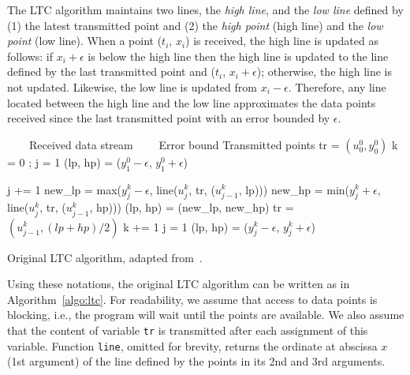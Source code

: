 \documentclass[10pt, conference, compsocconf]{IEEEtran}
\newcommand{\Desc}[2]{\State \makebox[2em][l]{#1}#2}
\begin{document}
The LTC algorithm maintains two lines, the \emph{high line}, and the
\emph{low line} defined by (1) the latest transmitted point and (2) the
\emph{high point} (high line) and the \emph{low point} (low line). When
a point ($t_i$, $x_i$) is received, the high line is updated as
follows: if $x_i+\epsilon$ is below the high line then the high line is
updated to the line defined by the last transmitted point and ($t_i$,
$x_i+\epsilon$); otherwise, the high line is not updated. Likewise, the low line
is updated from $x_i-\epsilon$. Therefore, any line located between the
high line and the low line approximates the data points received since
the last transmitted point with an error bounded by $\epsilon$.

\begin{algorithm}
\begin{algorithmic}[1]
\Input
   \Desc{$(u^k_j, y^k_j)$}{$\quad \quad $Received data stream}
   \Desc{$\epsilon$}{$\quad \quad$Error bound}
\EndInput
\Output
   \Desc{tr}{Transmitted points}
\EndOutput
\State tr = $(u^0_0, y^0_0)$ 
\State k = 0 ; j = 1
\State (lp, hp) = ($y^0_1 - \epsilon$, $y^0_1 + \epsilon$) 

 
    \State j += 1
    \State new\_lp = max($y^k_j-\epsilon$, line($u^k_j$, tr, ($u^k_{j-1}$, lp)))
    \State new\_hp = min($y^k_j+\epsilon$, line($u^k_j$, tr, ($u^k_{j-1}$, hp)))
     
        \State (lp, hp) = (new\_lp, new\_hp)
    \Else
        \State tr = $(u^k_{j-1}, (lp+hp)/2)$
        \State k += 1
        \State j = 1
        \State (lp, hp) = ($y^k_j-\epsilon$, $y^k_j+\epsilon$)
    \EndIf
\EndWhile
\end{algorithmic}
\caption{Original LTC algorithm, adapted from~\cite{schoellhammer2004lightweight}.}
\label{algo:ltc}
\end{algorithm}

Using these notations, the original LTC algorithm can
be written as in Algorithm~\ref{algo:ltc}. For readability, we assume
that access to data points is blocking, i.e., the program will wait
until the points are available. We also assume that the content of
variable \texttt{tr} is transmitted after each assignment of this
variable. Function \texttt{line}, omitted for brevity, returns the
ordinate at abscissa $x$ (1st argument) of the line defined by the points
in its 2nd and 3rd arguments.
\end{document}
